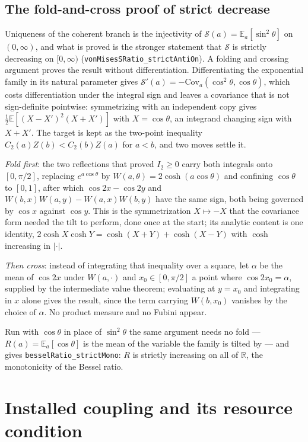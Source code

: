 \documentclass{article}
\begin{document}
\subsection{The fold-and-cross proof of strict decrease}
\label{sec:fold}
Uniqueness of the coherent branch is the injectivity of $\mathcal{S}(a) = \mathbb{E}_a[\sin^2\theta]$ on $(0,\infty)$, and what is proved is the stronger statement that $\mathcal{S}$ is strictly decreasing on $[0,\infty)$ (\nolinkurl{vonMisesSRatio_strictAntiOn}). A folding and crossing argument proves the result without differentiation. Differentiating the exponential family in its natural parameter gives $\mathcal{S}'(a) = -\mathrm{Cov}_a(\cos^2\theta,\cos\theta)$, which costs differentiation under the integral sign and leaves a covariance that is not sign-definite pointwise: symmetrizing with an independent copy gives $\tfrac12\mathbb{E}[(X-X')^2(X+X')]$ with $X = \cos\theta$, an integrand changing sign with $X + X'$. The target is kept as the two-point inequality $C_2(a)Z(b) < C_2(b)Z(a)$ for $a < b$, and two moves settle it.

\emph{Fold first}: the two reflections that proved $I_2 \ge 0$ carry both integrals onto $[0,\pi/2]$, replacing $e^{a\cos\theta}$ by $W(a,\theta) = 2\cosh(a\cos\theta)$ and confining $\cos\theta$ to $[0,1]$, after which $\cos 2x - \cos 2y$ and $W(b,x)W(a,y) - W(a,x)W(b,y)$ have the same sign, both being governed by $\cos x$ against $\cos y$. This is the symmetrization $X \mapsto -X$ that the covariance form needed the tilt to perform, done once at the start; its analytic content is one identity, $2\cosh X\cosh Y = \cosh(X{+}Y)+\cosh(X{-}Y)$ with $\cosh$ increasing in $|\cdot|$.

\emph{Then cross}: instead of integrating that inequality over a square, let $\alpha$ be the mean of $\cos 2x$ under $W(a,\cdot)$ and $x_0 \in [0,\pi/2]$ a point where $\cos 2x_0 = \alpha$, supplied by the intermediate value theorem; evaluating at $y = x_0$ and integrating in $x$ alone gives the result, since the term carrying $W(b,x_0)$ vanishes by the choice of $\alpha$. No product measure and no Fubini appear.

Run with $\cos\theta$ in place of $\sin^2\!\theta$ the same argument needs no fold --- $R(a) = \mathbb{E}_a[\cos\theta]$ is the mean of the variable the family is tilted by --- and gives \nolinkurl{besselRatio_strictMono}: $R$ is strictly increasing on all of $\mathbb{R}$, the monotonicity of the Bessel ratio.

\section{Installed coupling and its resource condition}
\label{sec:supp-installation}
\end{document}
